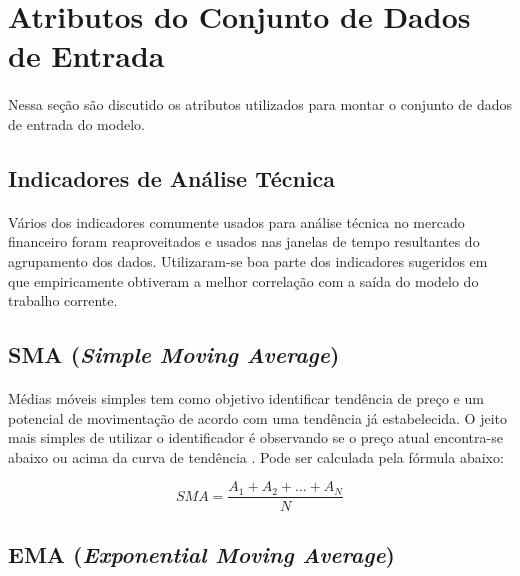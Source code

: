 \documentclass[grad,numbers]{coppe}
\begin{document}
      \section{Atributos do Conjunto de Dados de Entrada}
      
      \paragraph{}Nessa seção são discutido os atributos utilizados para montar o conjunto de dados de entrada do modelo. 
      
      \subsection{Indicadores de Análise Técnica}
        
          \paragraph{}Vários dos indicadores comumente usados para análise técnica no mercado financeiro foram reaproveitados e usados nas janelas de tempo resultantes do agrupamento dos dados. Utilizaram-se boa parte dos indicadores sugeridos em \citet{everton-silva-master} que empiricamente obtiveram a melhor correlação com a saída do modelo do trabalho corrente.
          
          \subsection{SMA (\textit{Simple Moving Average})}
            \paragraph{}Médias móveis simples tem como objetivo identificar tendência de preço e um potencial de movimentação de acordo com uma tendência já estabelecida. O jeito mais simples de utilizar o identificador é observando se o preço atual encontra-se abaixo ou acima da curva de tendência \cite{sma-indicator}. Pode ser calculada pela fórmula abaixo:
            
            \begin{equation} \label{eq:sma}
                SMA = \frac{A_1 + A_2 + ... + A_N}{N} 
            \end{equation}
            
        \subsection{EMA (\textit{Exponential Moving Average})}
\end{document}
